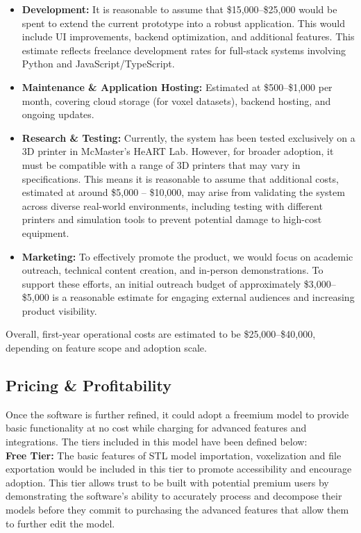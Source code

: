 \documentclass[12pt, titlepage]{article}
\begin{document}
\begin{itemize}
    \item \textbf{Development:} It is reasonable to assume that \$15,000–\$25,000 would be spent to extend the current prototype into a robust application. This would include UI improvements, backend optimization, and additional features. This estimate reflects freelance development rates for full-stack systems involving Python and JavaScript/TypeScript.
    \item \textbf{Maintenance \& Application Hosting:} Estimated at \$500–\$1,000 per month, covering cloud storage (for voxel datasets), backend hosting, and ongoing updates.
    \item \textbf{Research \& Testing:} Currently, the system has been tested exclusively on a 3D printer in McMaster's HeART Lab. However, for broader adoption, it must be compatible with a range of 3D printers that may vary in specifications. This means it is reasonable to assume that additional costs, estimated at around \$5,000 – \$10,000, may arise from validating the system across diverse real-world environments, including testing with different printers and simulation tools to prevent potential damage to high-cost equipment.
    \item \textbf{Marketing:} To effectively promote the product, we would focus on academic outreach, technical content creation, and in-person demonstrations. To support these efforts, an initial outreach budget of approximately \$3,000–\$5,000 is a reasonable estimate for engaging external audiences and increasing product visibility.
\end{itemize}  

Overall, first-year operational costs are estimated to be \$25,000–\$40,000, depending on feature scope and adoption scale.

\subsection{Pricing \& Profitability}

Once the software is further refined, it could adopt a freemium model to provide basic functionality at no cost while charging for advanced features and integrations. The tiers included in this model have been defined below: \\

\noindent \textbf{Free Tier:} The basic features of STL model importation, voxelization and file exportation would be included in this tier to promote accessibility and encourage adoption. This tier allows trust to be built with potential premium users by demonstrating the software’s ability to accurately process and decompose their models before they commit to purchasing the advanced features that allow them to further edit the model. \\
\end{document}
